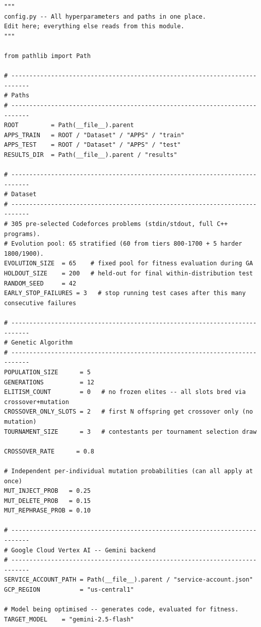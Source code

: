 \documentclass[11pt,a4paper]{report}
\newcommand{\pyfile}[1]{\texttt{#1}}
\begin{document}
\begin{lstlisting}[style=pycode, caption={\pyfile{config.py} --- complete source.}]
"""
config.py -- All hyperparameters and paths in one place.
Edit here; everything else reads from this module.
"""

from pathlib import Path

# ---------------------------------------------------------------------------
# Paths
# ---------------------------------------------------------------------------
ROOT         = Path(__file__).parent
APPS_TRAIN   = ROOT / "Dataset" / "APPS" / "train"
APPS_TEST    = ROOT / "Dataset" / "APPS" / "test"
RESULTS_DIR  = Path(__file__).parent / "results"

# ---------------------------------------------------------------------------
# Dataset
# ---------------------------------------------------------------------------
# 305 pre-selected Codeforces problems (stdin/stdout, full C++ programs).
# Evolution pool: 65 stratified (60 from tiers 800-1700 + 5 harder 1800/1900).
EVOLUTION_SIZE  = 65    # fixed pool for fitness evaluation during GA
HOLDOUT_SIZE    = 200   # held-out for final within-distribution test
RANDOM_SEED     = 42
EARLY_STOP_FAILURES = 3   # stop running test cases after this many consecutive failures

# ---------------------------------------------------------------------------
# Genetic Algorithm
# ---------------------------------------------------------------------------
POPULATION_SIZE      = 5
GENERATIONS          = 12
ELITISM_COUNT        = 0   # no frozen elites -- all slots bred via crossover+mutation
CROSSOVER_ONLY_SLOTS = 2   # first N offspring get crossover only (no mutation)
TOURNAMENT_SIZE      = 3   # contestants per tournament selection draw

CROSSOVER_RATE      = 0.8

# Independent per-individual mutation probabilities (can all apply at once)
MUT_INJECT_PROB   = 0.25
MUT_DELETE_PROB   = 0.15
MUT_REPHRASE_PROB = 0.10

# ---------------------------------------------------------------------------
# Google Cloud Vertex AI -- Gemini backend
# ---------------------------------------------------------------------------
SERVICE_ACCOUNT_PATH = Path(__file__).parent / "service-account.json"
GCP_REGION           = "us-central1"

# Model being optimised -- generates code, evaluated for fitness.
TARGET_MODEL    = "gemini-2.5-flash"


\end{lstlisting}
\end{document}
